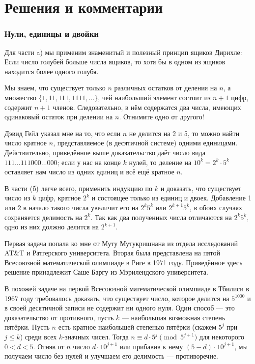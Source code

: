 \section*{Решения и комментарии}

\subsubsection*{Нули, единицы и двойки}%

Для части a) мы применим знаменитый и полезный принцип ящиков Дирихле:
Если число голубей больше числа ящиков, то хотя бы в одном из ящиков находится более одного голубя.

Мы знаем, что существует только $n$ различных остатков от деления на $n$, а множество $\{1, 11, 111, 1111,\dots\}$, чей наибольший элемент
состоит из $n+1$ цифр, содержит $n+1$ членов.
Следовательно, в нём содержатся два числа, имеющих одинаковый остаток при делении на $n$.
Отнимите одно от другого!
\heart

Дэвид Гейл %
указал мне на то, %
что если $n$ не делится на 2 и 5, то можно найти число кратное $n$, представляемое (в десятичной системе) одними единицами.
Действительно, приведённое выше доказательство даёт число вида $111\dots111000\dots000$; 
если у нас на конце $k$ нулей, то деление на $10^k=2^k\cdot 5^k$ оставляет нам число из одних единиц и всё ещё кратное $n$.

В части (б) легче всего, применить индукцию по $k$
и доказать, что существует число из $k$ цифр, кратное $2^k$ и состоящее только из единиц и двоек.
Добавление 1 или 2 в начало такого числа увеличит его на $2^k5^k$ или $2^{k+1}5^k$, в обоих случаях сохраняется делимость на $2^k$.
Так как два полученных числа отличаются на $2^k5^k$, одно из них должно делится на $2^{k+1}$.
\heart

Первая задача попала ко мне от Муту Мутукришнана %
из отдела исследований AT\&T и Ратгерского университета.
Вторая была представлена на пятой Всесоюзной математической олимпиаде в Риге в 1971 году.
Приведённое здесь решение принадлежит Саше Баргу %
из Мэрилендского университета.

\medskip

В похожей задаче на первой Всесоюзной математической олимпиаде в Тбилиси в 1967 году требовалось доказать, что существует число, которое делится на $5^{1000}$ и в своей десятичной записи не содержит ни одного нуля.
Один способ --- это доказательство от противного, 
пусть $k$ --- наибольшая возможная степень пятёрки.
Пусть $n$ есть кратное наибольшей степенью пятёрки (скажем $5^j$ при $j\le k$)
среди всех $k$-значных чисел.
Тогда $n\equiv d\cdot 5^j\pmod{5^{j+1}}$ для некоторого $0<d<5$.
Отняв от $n$ число $d\cdot 10^{j+1}$ или прибавив к нему $(5-d)\cdot 10^{j+1}$, мы получаем число без нулей и улучшаем его делимость --- противоречие.
\heart

